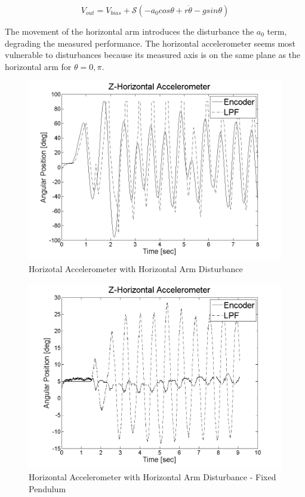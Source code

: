\documentclass{article}
\theoremstyle{plain}
\theoremstyle{definition}
\theoremstyle{remark}
\newcommand{\Sens}{\mathcal{S}}
\begin{document}
$$V_{out} = V_{bias} + \Sens \left ( -a_{0}cos\theta + r\ddot\theta - gsin\theta\right)$$

 The movement of the horizontal arm introduces the disturbance the $a_0$ term, degrading the measured performance. The horizontal accelerometer seems most vulnerable to disturbances because its measured axis is on the same plane as the horizontal arm for $\theta = 0, \pi$.

\begin{figure}[hbt]
\begin{center}
\includegraphics[width = 13cm]{Z_Horizontal_Dist2.png}
\caption{Horizotal Accelerometer with Horizontal Arm Disturbance}
\label{Z_Horizontal_Dist2}
\end{center}
\end{figure}

\begin{figure}[hbt]
\begin{center}
\includegraphics[width = 13cm]{Z_PendulumFixed_Dist.png}
\caption{Horizontal Accelerometer with Horizontal Arm Disturbance - Fixed Pendulum}
\label{Z_PendulumFixed_Dist}
\end{center}
\end{figure}
\end{document}
